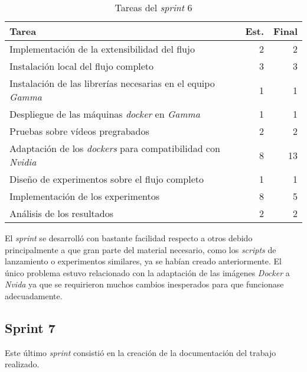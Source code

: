 \begin{table}[H]
	\begin{tabularx}{\linewidth}{X r r}
		\toprule \textbf{Tarea} & \textbf{Est.} & \textbf{Final}\\
		\toprule
		Implementación de la extensibilidad del flujo & 2 & 2\\
		Instalación local del flujo completo & 3 & 3\\
		Instalación de las librerías necesarias en el equipo \textit{Gamma} & 1 & 1\\
		Despliegue de las máquinas \textit{docker} en \textit{Gamma} & 1 & 1\\
		Pruebas sobre vídeos pregrabados & 2 & 2\\
		Adaptación de los \textit{dockers} para compatibilidad con \textit{Nvidia} & 8 & 13\\
		Diseño de experimentos sobre el flujo completo & 1 & 1\\
		Implementación de los experimentos & 8 & 5\\
		Análisis de los resultados & 2 & 2\\
		\bottomrule
	\end{tabularx}
	\caption{Tareas del \textit{sprint} 6}
	\label{tab:sprint6}
\end{table}

El \textit{sprint} se desarrolló con bastante facilidad respecto a otros debido principalmente a que gran parte del material necesario, como los \textit{scripts} de lanzamiento o experimentos similares, ya se habían creado anteriormente. El único problema estuvo relacionado con la adaptación de las imágenes \textit{Docker} a \textit{Nvida} ya que se requirieron muchos cambios inesperados para que funcionase adecuadamente.

\subsection{Sprint 7}

Este último \textit{sprint} consistió en la creación de la documentación del trabajo realizado. 

